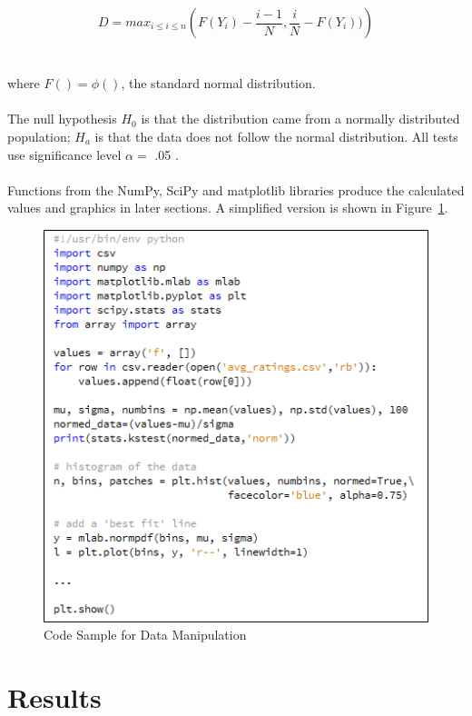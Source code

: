 \documentclass[prodmode,acmtecs]{acmsmall}
\begin{document}
\begin{equation}
\label{eqn:k-s}
D = max_{i\leq i\leq n}\left ( F(Y_i) - \frac{i-1}{N},\frac{i}{N}-F(Y_i)) \right )
\end{equation}\\\\
where $F()=\phi()$, the standard normal distribution.
\\
\\
The null hypothesis $H_0$ is that the distribution came from a normally distributed population; $H_a$ is that the data does not follow the normal distribution. All tests use significance level $\alpha=$ .05
\cite{korn:handbook}.
\\
\\
Functions from the NumPy, SciPy and matplotlib libraries produce the calculated values and graphics in later sections. A simplified version is shown in Figure~\ref{fig:code}.

\begin{figure}
\centerline{\includegraphics[scale=.7]{code_sample.png}}
\caption{Code Sample for Data Manipulation}
\label{fig:code}
\end{figure}

\clearpage

\medskip

\section{Results}
\end{document}
